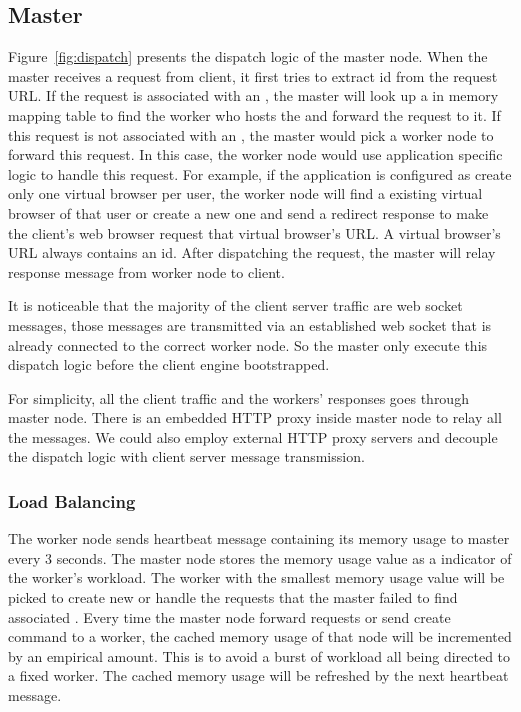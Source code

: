 \newarchitectureoverview{}




\subsection{Master}
Figure~\ref{fig:dispatch} presents the dispatch logic of the master node.
When the master receives a request from client,
it first tries to extract \appins{} id from the request URL.
If the request is associated with an \appins{},
the master will look up a in memory mapping table to find the worker
who hosts the \appins{} and forward the request to it.
If this request is not associated with an \appins{},
the master would pick a worker node to forward this request.
In this case, the worker node would use application specific logic to handle this request.
For example, if the application is configured as create only one virtual browser per user,
the worker node will find a existing virtual browser of that user or create a new one
and send a redirect response to make the client's web browser request that virtual browser's URL.
A virtual browser's URL always contains an \appins{} id.
After dispatching the request,
the master will relay response message from worker node to client.

It is noticeable that the majority of the client server traffic are web socket messages,
those messages are transmitted via an established web socket that is already connected to the 
correct worker node.
So the master only execute this dispatch logic before the client engine bootstrapped.

For simplicity, all the client traffic and the workers' responses goes through master node.
There is an embedded HTTP proxy inside master node to relay all the messages.
We could also employ external HTTP proxy servers and decouple the dispatch logic with
client server message transmission.

\requestdispatchdiagram{}

\subsubsection{Load Balancing}
The worker node sends heartbeat message containing its memory usage to master every 3 seconds.
The master node stores the memory usage value as a indicator of the worker's workload.
The worker with the smallest memory usage value will be picked to create new \appins{} or
handle the requests that the master failed to find associated \appins{}.
Every time the master node forward requests or send create \appins{} command to a worker,
the cached memory usage of that node will be incremented by an empirical amount.
This is to avoid a burst of workload all being directed to a fixed worker.
The cached memory usage will be refreshed by the next heartbeat message.



